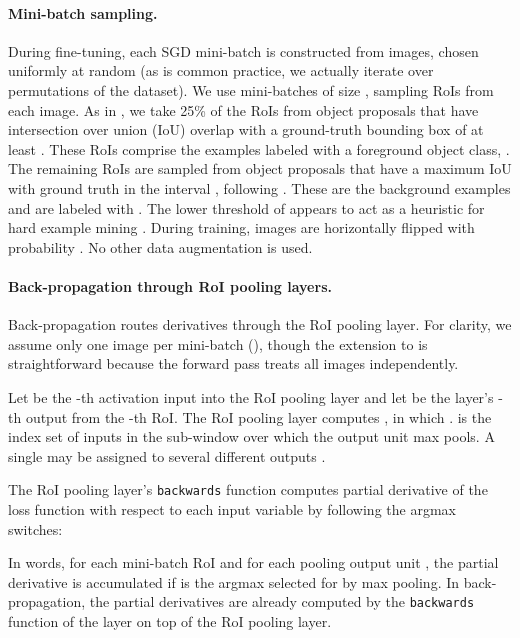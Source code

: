 \documentclass[10pt,twocolumn,letterpaper]{article}
\newcommand{\roi}{RoI\xspace}
\begin{document}
\paragraph{Mini-batch sampling.}
During fine-tuning, each SGD mini-batch is constructed from  images, chosen uniformly at random (as is common practice, we actually iterate over permutations of the dataset).
We use mini-batches of size , sampling  {\roi}s from each image.
As in \cite{girshick2014rcnn}, we take 25\% of the {\roi}s from object proposals that have intersection over union (IoU) overlap with a ground-truth bounding box of at least .
These {\roi}s comprise the examples labeled with a foreground object class, \ie .
The remaining {\roi}s are sampled from object proposals that have a maximum IoU with ground truth in the interval , following \cite{he2014spp}.
These are the background examples and are labeled with .
The lower threshold of  appears to act as a heuristic for hard example mining \cite{lsvm-pami}.
During training, images are horizontally flipped with probability .
No other data augmentation is used.

\paragraph{Back-propagation through \roi pooling layers.}




Back-propagation routes derivatives through the \roi pooling layer.
For clarity, we assume only one image per mini-batch (), though the extension to  is straightforward because the forward pass treats all images independently.

Let  be the -th activation input into the \roi pooling layer and let  be the layer's -th output from the -th \roi.
The \roi pooling layer computes , in which .
 is the index set of inputs in the sub-window over which the output unit  max pools.
A single  may be assigned to several different outputs .

The \roi pooling layer's \texttt{backwards} function computes partial derivative of the loss function with respect to each input variable  by following the argmax switches:

In words, for each mini-batch \roi  and for each pooling output unit , the partial derivative  is accumulated if  is the argmax selected for  by max pooling.
In back-propagation, the partial derivatives  are already computed by the \texttt{backwards} function of the layer on top of the \roi pooling layer.
\end{document}
